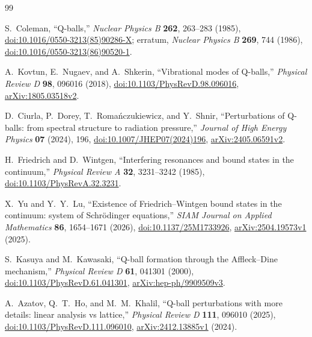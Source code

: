 \begin{thebibliography}{99}

S.~Coleman,
``Q-balls,''
\emph{Nuclear Physics B} \textbf{262}, 263--283 (1985),
\href{https://doi.org/10.1016/0550-3213(85)90286-X}{doi:10.1016/0550-3213(85)90286-X};
erratum, \emph{Nuclear Physics B} \textbf{269}, 744 (1986),
\href{https://doi.org/10.1016/0550-3213(86)90520-1}{doi:10.1016/0550-3213(86)90520-1}.

A.~Kovtun, E.~Nugaev, and A.~Shkerin,
``Vibrational modes of Q-balls,''
\emph{Physical Review D} \textbf{98}, 096016 (2018),
\href{https://doi.org/10.1103/PhysRevD.98.096016}{doi:10.1103/PhysRevD.98.096016},
\href{https://arxiv.org/abs/1805.03518v2}{arXiv:1805.03518v2}.

D.~Ciurla, P.~Dorey, T.~Roma\'nczukiewicz, and Y.~Shnir,
``Perturbations of Q-balls: from spectral structure to radiation pressure,''
\emph{Journal of High Energy Physics} \textbf{07} (2024), 196,
\href{https://doi.org/10.1007/JHEP07(2024)196}{doi:10.1007/JHEP07(2024)196},
\href{https://arxiv.org/abs/2405.06591v2}{arXiv:2405.06591v2}.

H.~Friedrich and D.~Wintgen,
``Interfering resonances and bound states in the continuum,''
\emph{Physical Review A} \textbf{32}, 3231--3242 (1985),
\href{https://doi.org/10.1103/PhysRevA.32.3231}{doi:10.1103/PhysRevA.32.3231}.

X.~Yu and Y.~Y.~Lu,
``Existence of Friedrich--Wintgen bound states in the continuum: system of Schr\"odinger equations,''
\emph{SIAM Journal on Applied Mathematics} \textbf{86}, 1654--1671 (2026),
\href{https://doi.org/10.1137/25M1733926}{doi:10.1137/25M1733926},
\href{https://arxiv.org/abs/2504.19573v1}{arXiv:2504.19573v1} (2025).

S.~Kasuya and M.~Kawasaki,
``Q-ball formation through the Affleck--Dine mechanism,''
\emph{Physical Review D} \textbf{61}, 041301 (2000),
\href{https://doi.org/10.1103/PhysRevD.61.041301}{doi:10.1103/PhysRevD.61.041301},
\href{https://arxiv.org/abs/hep-ph/9909509v3}{arXiv:hep-ph/9909509v3}.

A.~Azatov, Q.~T.~Ho, and M.~M.~Khalil,
``Q-ball perturbations with more details: linear analysis vs lattice,''
\emph{Physical Review D} \textbf{111}, 096010 (2025),
\href{https://doi.org/10.1103/PhysRevD.111.096010}{doi:10.1103/PhysRevD.111.096010},
\href{https://arxiv.org/abs/2412.13885v1}{arXiv:2412.13885v1} (2024).


\end{thebibliography}
